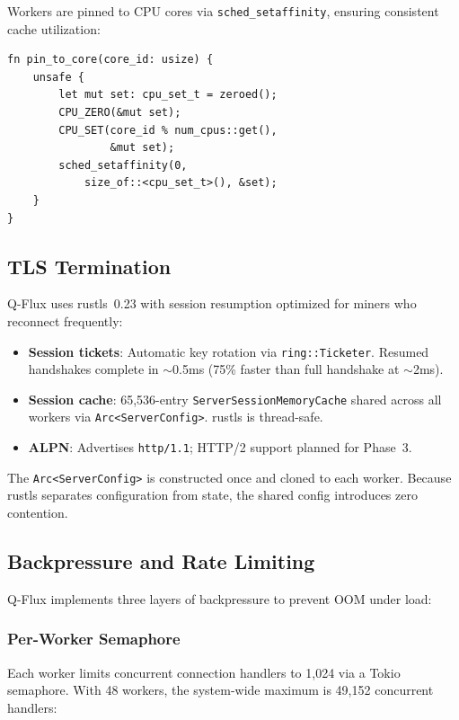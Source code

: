 \documentclass[11pt,a4paper,twocolumn]{article}
\begin{document}
Workers are pinned to CPU cores via \texttt{sched\_setaffinity}, ensuring consistent cache utilization:

\begin{lstlisting}
fn pin_to_core(core_id: usize) {
    unsafe {
        let mut set: cpu_set_t = zeroed();
        CPU_ZERO(&mut set);
        CPU_SET(core_id % num_cpus::get(),
                &mut set);
        sched_setaffinity(0,
            size_of::<cpu_set_t>(), &set);
    }
}
\end{lstlisting}

\subsection{TLS Termination}

Q-Flux uses rustls~0.23 with session resumption optimized for miners who reconnect frequently:

\begin{itemize}[nosep]
\item \textbf{Session tickets}: Automatic key rotation via \texttt{ring::Ticketer}. Resumed handshakes complete in $\sim$0.5ms (75\% faster than full handshake at $\sim$2ms).
\item \textbf{Session cache}: 65,536-entry \texttt{ServerSessionMemoryCache} shared across all workers via \texttt{Arc<ServerConfig>}. rustls is thread-safe.
\item \textbf{ALPN}: Advertises \texttt{http/1.1}; HTTP/2 support planned for Phase~3.
\end{itemize}

The \texttt{Arc<ServerConfig>} is constructed once and cloned to each worker. Because rustls separates configuration from state, the shared config introduces zero contention.

\subsection{Backpressure and Rate Limiting}

Q-Flux implements three layers of backpressure to prevent OOM under load:

\subsubsection{Per-Worker Semaphore}

Each worker limits concurrent connection handlers to 1,024 via a Tokio semaphore. With 48 workers, the system-wide maximum is 49,152 concurrent handlers:
\end{document}
